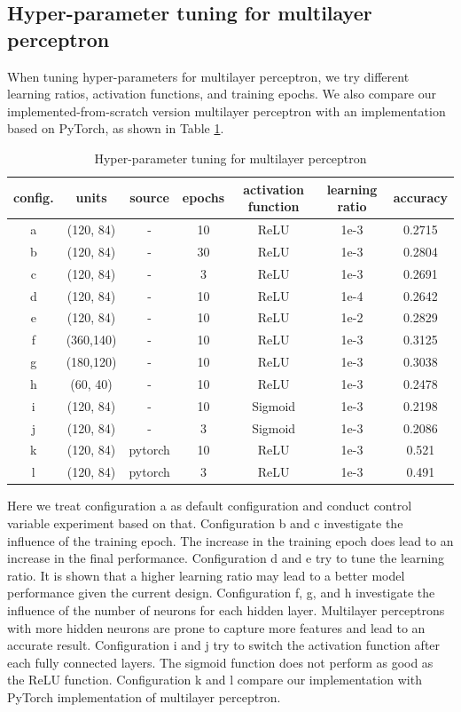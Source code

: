 \documentclass[11pt]{scrartcl}
\begin{document}
\subsection{Hyper-parameter tuning for multilayer perceptron}
When tuning hyper-parameters for multilayer perceptron, we try different learning ratios, activation functions, and training epochs. We also compare our implemented-from-scratch version multilayer perceptron with an implementation based on PyTorch, as shown in Table \ref{MLP}.


\begin{table}[H]
	\centering
	\begin{tabular}{c|cccccc}
		\hline
		  config. & units & source & epochs & activation function & learning ratio & accuracy  \\
		\hline
		  a & (120, 84) & - & 10 & ReLU & 1e-3 & 0.2715 \\
		 \hline
		  b & (120, 84) & - & 30 & ReLU & 1e-3 & 0.2804 \\
		  c & (120, 84) & - & 3  & ReLU & 1e-3 & 0.2691 \\
		 \hline
		  d & (120, 84) & - & 10 & ReLU & 1e-4 & 0.2642 \\
		  e & (120, 84) & - & 10 & ReLU & 1e-2 & 0.2829 \\
		 \hline
		  f & (360,140) & - & 10 & ReLU & 1e-3 & 0.3125 \\
		  g & (180,120) & - & 10 & ReLU & 1e-3 & 0.3038 \\
		  h & (60, 40)  & - & 10 & ReLU & 1e-3 & 0.2478 \\
		 \hline
		  i & (120, 84) & - & 10 & Sigmoid & 1e-3 & 0.2198 \\
		  j & (120, 84) & - & 3  & Sigmoid & 1e-3 & 0.2086 \\
		 \hline
		  k & (120, 84) & pytorch & 10 & ReLU & 1e-3 & 0.521 \\
		  l & (120, 84) & pytorch & 3  & ReLU & 1e-3 & 0.491 \\
		\hline
	\end{tabular} 
	\caption{Hyper-parameter tuning for multilayer perceptron}
	\label{MLP}
\end{table}

Here we treat configuration a as default configuration and conduct control variable experiment based on that. Configuration b and c investigate the influence of the training epoch. The increase in the training epoch does lead to an increase in the final performance. Configuration d and e try to tune the learning ratio. It is shown that a higher learning ratio may lead to a better model performance given the current design. Configuration f, g, and h investigate the influence of the number of neurons for each hidden layer. Multilayer perceptrons with more hidden neurons are prone to capture more features and lead to an accurate result. Configuration i and j try to switch the activation function after each fully connected layers. The sigmoid function does not perform as good as the ReLU function. Configuration k and l compare our implementation with PyTorch implementation of multilayer perceptron.
\end{document}

